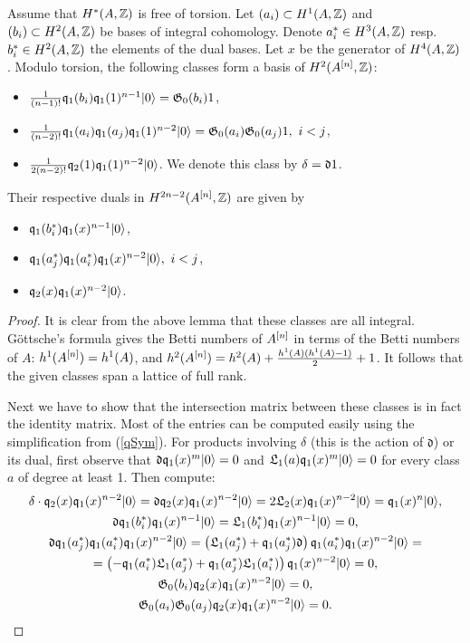 \begin{proposition} Assume that $H^*(A,\mathbb{Z})$ is free of torsion.
Let $(a_i) \subset H^1(A,\mathbb{Z})$ and $(b_i)\subset H^2(A,\mathbb{Z})$ be bases of integral cohomology. Denote $a_i^*\in H^3(A,\mathbb{Z})$ resp.~$b_i^*\in H^2(A,\mathbb{Z})$ the elements of the dual bases. Let $x$ be the generator of $H^4(A,\mathbb{Z})$. Modulo torsion, the following classes form a basis of $H^2(A^{[n]},\mathbb{Z})$:
\begin{itemize}
 \item $\frac{1}{(n-1)!}\mathfrak{q}_{1}(b_{i})\mathfrak{q}_{1}(1)^{n-1}|0\rangle = \mathfrak{G}_0(b_i) 1$,
 \item $ \frac{1}{(n-2)!}\mathfrak{q}_{1}(a_{i})\mathfrak{q}_{1}(a_{j})\mathfrak{q}_{1}(1)^{n-2}|0\rangle = \mathfrak{G}_0(a_i) \mathfrak{G}_0(a_j)1,\  i < j$, 
 \item $ \frac{1}{2(n-2)!}\mathfrak{q}_{2}(1) \mathfrak{q}_{1}(1)^{n-2}|0\rangle$. We denote this class by $\delta = \mathfrak{d} 1$.
\end{itemize}
Their respective duals in $H^{2n-2}(A^{[n]},\mathbb{Z})$ are given by
\begin{itemize}
 \item $\mathfrak{q}_{1}(b_{i}^*)\mathfrak{q}_{1}(x)^{n-1}|0\rangle$,
 \item $\mathfrak{q}_{1}(a_{j}^*)\mathfrak{q}_{1}(a_{i}^*)\mathfrak{q}_{1}(x)^{n-2}|0\rangle,\  i < j$,
 \item $\mathfrak{q}_2(x)\mathfrak{q}_{1}(x)^{n-2} |0\rangle$.
\end{itemize}
\end{proposition}
\begin{proof} It is clear from the above lemma that these classes are all integral.
G\"ottsche's formula \cite[p.~35]{Gottsche} gives the Betti numbers of $A^{[n]}$ in terms of the Betti numbers of $A$: 
$h^1(A^{[n]}) = h^1(A)$, and $h^2(A^{[n]}) = h^2(A)+ \frac{h^1(A)(h^1(A)-1)}{2} + 1$. It follows that the given classes span a lattice of full rank.

Next we have to show that the intersection matrix between these classes is in fact the identity matrix. Most of the entries can be computed easily using the simplification from (\ref{qSym}). For products involving $\delta$ (this is the action of $\mathfrak{d}$) or its dual, first observe that $\mathfrak{d}\mathfrak{q}_1(x)^m|0\rangle = 0 $ and $ \mathfrak{L}_1(a)\mathfrak{q}_1(x)^m|0\rangle =0$ for every class $a$ of degree at least 1. Then compute:
\begin{gather*}
\delta \cdot\mathfrak{q}_2(x)\mathfrak{q}_{1}(x)^{n-2} |0\rangle = \mathfrak{d}\mathfrak{q}_2(x)\mathfrak{q}_{1}(x)^{n-2} |0\rangle = 2 \mathfrak{L}_2(x) \mathfrak{q}_{1}(x)^{n-2} |0\rangle = \mathfrak{q}_{1}(x)^{n}|0\rangle,
\\
\mathfrak{d}\mathfrak{q}_{1}(b_{i}^*)\mathfrak{q}_{1}(x)^{n-1}|0\rangle =  \mathfrak{L}_1(b_i^*) \mathfrak{q}_{1}(x)^{n-1} |0\rangle = 0,
\\
\mathfrak{d}\mathfrak{q}_{1}(a_{j}^*)\mathfrak{q}_{1}(a_{i}^*)\mathfrak{q}_{1}(x)^{n-2}|0\rangle = \left(\mathfrak{L}_1(a_j^*) +\mathfrak{q}_{1}(a_{j}^*)\mathfrak{d}\right)\mathfrak{q}_{1}(a_{i}^*)\mathfrak{q}_{1}(x)^{n-2}|0\rangle = 
  \\ =\left(-\mathfrak{q}_1(a_i^*)\mathfrak{L}_1(a_j^*) + \mathfrak{q}_{1}(a_{j}^*)\mathfrak{L}_1(a_i^*)\right)\mathfrak{q}_{1}(x)^{n-2}|0\rangle  = 0,
\\
\mathfrak{G}_0(b_i)\mathfrak{q}_2(x)\mathfrak{q}_{1}(x)^{n-2} |0\rangle = 0, 
\\
\mathfrak{G}_0(a_i)\mathfrak{G}_0(a_j)\mathfrak{q}_2(x)\mathfrak{q}_{1}(x)^{n-2} |0\rangle = 0.
\end{gather*}
\end{proof}

